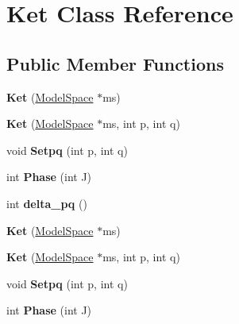 \hypertarget{classKet}{\section{Ket Class Reference}
\label{classKet}
}
\subsection*{Public Member Functions}
\begin{DoxyCompactItemize}
\item 
\hypertarget{classKet_a6ae7282513e6c7799799a257213c5da2}{{\bfseries Ket} (\hyperlink{classModelSpace}{Model\-Space} $\ast$ms)}\label{classKet_a6ae7282513e6c7799799a257213c5da2}

\item 
\hypertarget{classKet_aaeed062871c0b45d5063813d362841e0}{{\bfseries Ket} (\hyperlink{classModelSpace}{Model\-Space} $\ast$ms, int p, int q)}\label{classKet_aaeed062871c0b45d5063813d362841e0}

\item 
\hypertarget{classKet_a3c9c1e007c9bf334e6d0bea724154aa1}{void {\bfseries Setpq} (int p, int q)}\label{classKet_a3c9c1e007c9bf334e6d0bea724154aa1}

\item 
\hypertarget{classKet_ac07bfbc7c7f2bdf77341ba6d54036e8e}{int {\bfseries Phase} (int J)}\label{classKet_ac07bfbc7c7f2bdf77341ba6d54036e8e}

\item 
\hypertarget{classKet_ac91fa789aa9e8043da735332b9db3e58}{int {\bfseries delta\-\_\-pq} ()}\label{classKet_ac91fa789aa9e8043da735332b9db3e58}

\item 
\hypertarget{classKet_a6ae7282513e6c7799799a257213c5da2}{{\bfseries Ket} (\hyperlink{classModelSpace}{Model\-Space} $\ast$ms)}\label{classKet_a6ae7282513e6c7799799a257213c5da2}

\item 
\hypertarget{classKet_aaeed062871c0b45d5063813d362841e0}{{\bfseries Ket} (\hyperlink{classModelSpace}{Model\-Space} $\ast$ms, int p, int q)}\label{classKet_aaeed062871c0b45d5063813d362841e0}

\item 
\hypertarget{classKet_a3c9c1e007c9bf334e6d0bea724154aa1}{void {\bfseries Setpq} (int p, int q)}\label{classKet_a3c9c1e007c9bf334e6d0bea724154aa1}

\item 
\hypertarget{classKet_ac07bfbc7c7f2bdf77341ba6d54036e8e}{int {\bfseries Phase} (int J)}\label{classKet_ac07bfbc7c7f2bdf77341ba6d54036e8e}


\end{DoxyCompactItemize}
